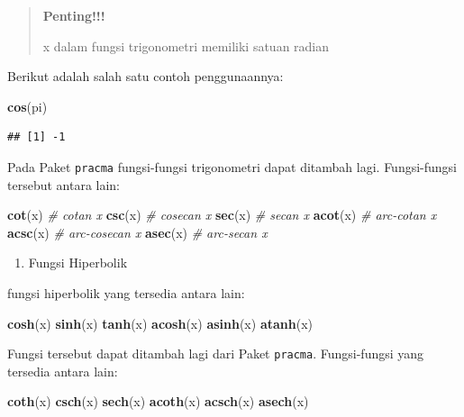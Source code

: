 \documentclass[]{book}
\newenvironment{Shaded}{\begin{snugshade}}{\end{snugshade}}
\newcommand{\CommentTok}[1]{\textcolor[rgb]{0.56,0.35,0.01}{\textit{#1}}}
\newcommand{\KeywordTok}[1]{\textcolor[rgb]{0.13,0.29,0.53}{\textbf{#1}}}
\newcommand{\NormalTok}[1]{#1}
\providecommand{\tightlist}{%
  \setlength{\itemsep}{0pt}\setlength{\parskip}{0pt}}
\theoremstyle{definition}
\theoremstyle{definition}
\theoremstyle{definition}
\theoremstyle{remark}
\begin{document}
\begin{quote}
\textbf{Penting!!!}

x dalam fungsi trigonometri memiliki satuan radian
\end{quote}

Berikut adalah salah satu contoh penggunaannya:

\begin{Shaded}
\begin{Highlighting}[]
\KeywordTok{cos}\NormalTok{(pi)}
\end{Highlighting}
\end{Shaded}

\begin{verbatim}
## [1] -1
\end{verbatim}

Pada Paket \texttt{pracma} fungsi-fungsi trigonometri dapat ditambah lagi. Fungsi-fungsi tersebut antara lain:

\begin{Shaded}
\begin{Highlighting}[]
\KeywordTok{cot}\NormalTok{(x) }\CommentTok{# cotan x}
\KeywordTok{csc}\NormalTok{(x) }\CommentTok{# cosecan x}
\KeywordTok{sec}\NormalTok{(x) }\CommentTok{# secan x}
\KeywordTok{acot}\NormalTok{(x) }\CommentTok{# arc-cotan x}
\KeywordTok{acsc}\NormalTok{(x) }\CommentTok{# arc-cosecan x}
\KeywordTok{asec}\NormalTok{(x) }\CommentTok{# arc-secan x}
\end{Highlighting}
\end{Shaded}

\begin{enumerate}
\def\labelenumi{\arabic{enumi}.}
\setcounter{enumi}{2}
\tightlist
\item
  Fungsi Hiperbolik
\end{enumerate}

fungsi hiperbolik yang tersedia antara lain:

\begin{Shaded}
\begin{Highlighting}[]
\KeywordTok{cosh}\NormalTok{(x) }
\KeywordTok{sinh}\NormalTok{(x)}
\KeywordTok{tanh}\NormalTok{(x)}
\KeywordTok{acosh}\NormalTok{(x)}
\KeywordTok{asinh}\NormalTok{(x)}
\KeywordTok{atanh}\NormalTok{(x)}
\end{Highlighting}
\end{Shaded}

Fungsi tersebut dapat ditambah lagi dari Paket \texttt{pracma}. Fungsi-fungsi yang tersedia antara lain:

\begin{Shaded}
\begin{Highlighting}[]
\KeywordTok{coth}\NormalTok{(x)}
\KeywordTok{csch}\NormalTok{(x)}
\KeywordTok{sech}\NormalTok{(x)}
\KeywordTok{acoth}\NormalTok{(x)}
\KeywordTok{acsch}\NormalTok{(x)}
\KeywordTok{asech}\NormalTok{(x)}
\end{Highlighting}
\end{Shaded}
\end{document}
